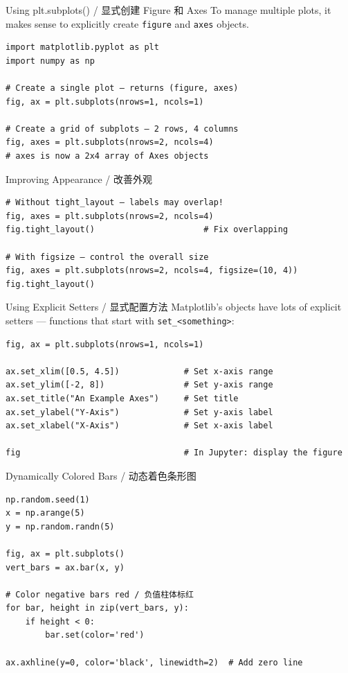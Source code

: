 \documentclass[11pt,a4paper]{report}
\let\oldtexttt\texttt
\renewcommand{\texttt}[1]{\textcolor{mainblue}{\oldtexttt{#1}}}
\begin{document}
\begin{examplebox}{Using plt.subplots() / 显式创建 Figure 和 Axes}
    To manage multiple plots, it makes sense to explicitly create \texttt{figure} and \texttt{axes} objects.
\begin{lstlisting}
import matplotlib.pyplot as plt
import numpy as np

# Create a single plot — returns (figure, axes)
fig, ax = plt.subplots(nrows=1, ncols=1)

# Create a grid of subplots — 2 rows, 4 columns
fig, axes = plt.subplots(nrows=2, ncols=4)
# axes is now a 2x4 array of Axes objects
\end{lstlisting}
\end{examplebox}

\begin{examplebox}{Improving Appearance / 改善外观}
\begin{lstlisting}
# Without tight_layout — labels may overlap!
fig, axes = plt.subplots(nrows=2, ncols=4)
fig.tight_layout()                      # Fix overlapping

# With figsize — control the overall size
fig, axes = plt.subplots(nrows=2, ncols=4, figsize=(10, 4))
fig.tight_layout()
\end{lstlisting}
\end{examplebox}

\begin{examplebox}{Using Explicit Setters / 显式配置方法}
    Matplotlib's objects have lots of explicit setters — functions that start with \texttt{set\_<something>}:
\begin{lstlisting}
fig, ax = plt.subplots(nrows=1, ncols=1)

ax.set_xlim([0.5, 4.5])             # Set x-axis range
ax.set_ylim([-2, 8])                # Set y-axis range
ax.set_title("An Example Axes")     # Set title
ax.set_ylabel("Y-Axis")             # Set y-axis label
ax.set_xlabel("X-Axis")             # Set x-axis label

fig                                 # In Jupyter: display the figure
\end{lstlisting}
\end{examplebox}

\begin{examplebox}{Dynamically Colored Bars / 动态着色条形图}
\begin{lstlisting}
np.random.seed(1)
x = np.arange(5)
y = np.random.randn(5)

fig, ax = plt.subplots()
vert_bars = ax.bar(x, y)

# Color negative bars red / 负值柱体标红
for bar, height in zip(vert_bars, y):
    if height < 0:
        bar.set(color='red')

ax.axhline(y=0, color='black', linewidth=2)  # Add zero line
\end{lstlisting}
\end{examplebox}
\end{document}

